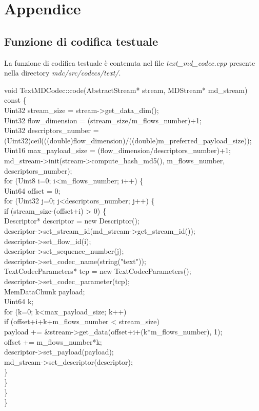 \chapter{Appendice}
\section{Funzione di codifica testuale}

La funzione di codifica testuale è contenuta nel file
\textit{text\_md\_codec.cpp} presente nella directory \textit{mdc/src/codecs/text/}.

\begin{code}
void TextMDCodec::code(AbstractStream* stream, MDStream* md\_stream) const \{\\
	Uint32 stream\_size = stream->get\_data\_dim();\\
	Uint32 flow\_dimension = (stream\_size/m\_flows\_number)+1;\\
	Uint32 descriptors\_number = \\(Uint32)ceil(((double)flow\_dimension)/((double)m\_preferred\_payload\_size));\\
	Uint16 max\_payload\_size = (flow\_dimension/descriptors\_number)+1;\\
	md\_stream->init(stream->compute\_hash\_md5(), m\_flows\_number, descriptors\_number);\\
	for (Uint8 i=0; i<m\_flows\_number; i++) \{\\
		Uint64 offset = 0;\\
		for (Uint32 j=0; j<descriptors\_number; j++) \{\\
			if (stream\_size-(offset+i) > 0) \{\\
				Descriptor* descriptor = new Descriptor();\\
				descriptor->set\_stream\_id(md\_stream->get\_stream\_id());\\
				descriptor->set\_flow\_id(i);\\
				descriptor->set\_sequence\_number(j);\\
				descriptor->set\_codec\_name(string("text"));\\
				TextCodecParameters* tcp = new TextCodecParameters();\\
				descriptor->set\_codec\_parameter(tcp);\\
				MemDataChunk payload;\\
				Uint64 k;\\
				for (k=0; k<max\_payload\_size; k++)\\
					if (offset+i+k+m\_flows\_number < stream\_size)\\
						payload += \&stream->get\_data(offset+i+(k*m\_flows\_number), 1);\\
				offset += m\_flows\_number*k;\\
				descriptor->set\_payload(payload);\\
				md\_stream->set\_descriptor(descriptor);\\
			\}\\
		\}\\
	\}\\
\}\\
\end{code}

